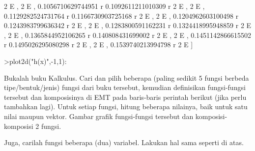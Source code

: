 \documentclass[a4paper,10pt]{article}
\begin{document}
\begin{eulernotebook}
\begin{eulercomment}
\begin{eulercomment}
\begin{eulercomment}
\begin{eulercomment}
\begin{eulercomment}
\begin{eulercomment}
\begin{eulercomment}
\begin{eulercomment}
\begin{eulercomment}
\begin{eulercomment}
\begin{eulercomment}
\begin{eulercomment}
\begin{eulercomment}
\begin{eulercomment}
\begin{eulercomment}
\begin{eulercomment}
\begin{eulercomment}
\begin{eulercomment}
\begin{eulercomment}
\begin{eulercomment}
\begin{eulercomment}
\begin{eulercomment}
\begin{eulercomment}
\begin{eulercomment}
\begin{euleroutput}
  2 E                    , 2 E                    , 
     0.1056710629744951 r     0.1092611211010309 r
  2 E                    , 2 E                    , 
     0.1129282524731764 r     0.1166730903725168 r
  2 E                    , 2 E                    , 
     0.1204962603100498 r     0.1243983799636342 r
  2 E                    , 2 E                    , 
     0.1283800591162231 r     0.1324418995948859 r
  2 E                    , 2 E                    , 
     0.1365844952106265 r     0.140808431699002 r
  2 E                    , 2 E                   , 
     0.1451142866615502 r     0.1495026295080298 r
  2 E                    , 2 E                    , 
     0.1539740213994798 r
  2 E                    ]
  
\end{euleroutput}
\begin{eulerprompt}
>plot2d("h(x)",-1,1):
\end{eulerprompt}
\begin{eulercomment}
Bukalah buku Kalkulus. Cari dan pilih beberapa (paling sedikit 5
fungsi berbeda tipe/bentuk/jenis) fungsi dari buku tersebut, kemudian
definisikan fungsi-fungsi tersebut dan komposisinya di EMT pada
baris-baris perintah berikut (jika perlu tambahkan lagi). Untuk setiap
fungsi, hitung beberapa nilainya, baik untuk satu nilai maupun vektor.
Gambar grafik fungsi-fungsi tersebut dan komposisi-komposisi 2 fungsi.

Juga, carilah fungsi beberapa (dua) variabel. Lakukan hal sama seperti
di atas.
\end{eulercomment}
\begin{eulercomment}


\end{eulercomment}
\end{eulercomment}
\end{eulercomment}
\end{eulercomment}
\end{eulercomment}
\end{eulercomment}
\end{eulercomment}
\end{eulercomment}
\end{eulercomment}
\end{eulercomment}
\end{eulercomment}
\end{eulercomment}
\end{eulercomment}
\end{eulercomment}
\end{eulercomment}
\end{eulercomment}
\end{eulercomment}
\end{eulercomment}
\end{eulercomment}
\end{eulercomment}
\end{eulercomment}
\end{eulercomment}
\end{eulercomment}
\end{eulercomment}
\end{eulercomment}
\end{eulernotebook}
\end{document}
